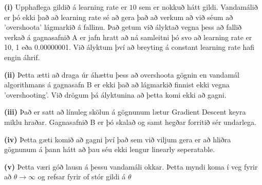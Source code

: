 \documentclass[11pt]{article}
\begin{document}
    \textbf{(i)} Upphaflega gildið á learning rate er \(10\) sem er nokkuð
hátt gildi. Vandamálið er þó ekki það að learning rate sé að gera það að
verkum að við séum að 'overshoota' lágmarkið á fallinu. Það getum við
ályktað vegna þess að fallið verkað á gagnasafnið A er jafn hratt að ná
samleitni þó svo að learning rate er 10, 1 eða 0.00000001. Við ályktum
því að breyting á constant learning rate hafi engin áhrif.

    \textbf{(ii)} Þetta ætti að draga úr áhættu þess að overshoota gögnin en
vandamál algorithmans á gagnasafn B er ekki það að lágmarkið finnist
ekki vegna 'overshooting'. Við drögum þá ályktunina að þetta komi ekki
að gagni. 

    \textbf{(iii)} Það er satt að línuleg skölun á gögnunum lætur Gradient
Descent keyra miklu hraðar. Gagnasafnið B er þó skalað og samt hegðar
forritið sér undarlega.

    \textbf{(iv)} Þetta gæti komið að gagni því það sem við viljum gera er
að hliðra gögnunum á þann hátt að þau séu ekki lengur linearly
seperatable.

    \textbf{(v)} Þetta væri góð lausn á þessu vandamáli okkar. Þetta myndi
koma í veg fyrir að \(\theta \rightarrow \infty\) og refsar fyrir of
stór gildi á \(\theta\)


    
    
    
    
\end{document}
